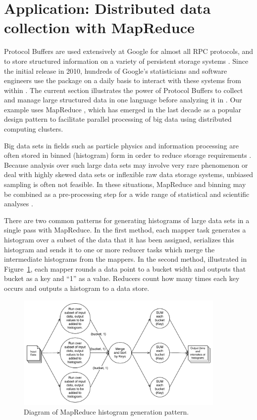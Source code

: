 \documentclass[article]{jss}
\begin{document}
\section{Application: Distributed data collection with MapReduce}
\label{sec:mapreduce}

Protocol Buffers are used extensively at Google for almost all
RPC protocols, and to store structured information on a variety of
persistent storage systems \citep{dean2009designs}. Since the
initial release in 2010, hundreds of Google's statisticians and
software engineers use the  package on a daily basis
to interact with these systems from within .
The current section illustrates the power of Protocol Buffers to
collect and manage large structured data in one language 
before analyzing it in . Our example uses MapReduce
\citep{dean2008mapreduce}, which has emerged in the last
decade as a popular design pattern to facilitate parallel 
processing of big data using distributed computing clusters.

Big data sets in fields such as particle physics and information
processing are often stored in binned (histogram) form in order 
to reduce storage requirements \citep{scott2009multivariate}. 
Because analysis over such large data sets may involve very rare
phenomenon or deal with highly skewed data sets or inflexible
raw data storage systems, unbiased sampling is often not feasible.
In these situations, MapReduce and binning may be combined as a
pre-processing step for a wide range of statistical and scientific
analyses \citep{blocker2013}.

There are two common patterns for generating histograms of large data
sets in a single pass with MapReduce. In the first method, each
mapper task generates a histogram over a subset of the data that it
has been assigned, serializes this histogram and sends it to one or
more reducer tasks which merge the intermediate histograms from the
mappers. In the second method, illustrated in
Figure~\ref{fig:mr-histogram-pattern1}, each mapper rounds a data
point to a bucket width and outputs that bucket as a key and ``1'' as a
value.  Reducers count how many times each key occurs and outputs a
histogram to a data store.

\begin{figure}[t!]
\centering
\includegraphics[width=0.9\textwidth]{histogram-mapreduce-diag1.pdf}
\caption{Diagram of MapReduce histogram generation pattern.}
\label{fig:mr-histogram-pattern1}
\end{figure}
\end{document}
